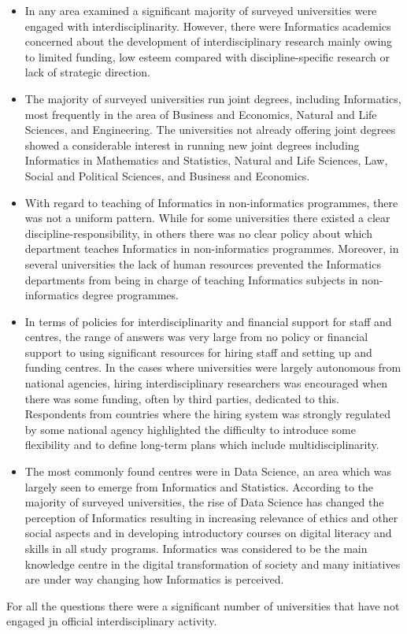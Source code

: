 \begin{itemize}
\item In any area examined a significant majority of surveyed universities were engaged with interdisciplinarity. However, there were Informatics academics concerned about the development of interdisciplinary research mainly owing to limited funding, low esteem compared with discipline-specific research or lack of strategic direction.
\item The majority of surveyed universities run joint degrees, including Informatics, most frequently in the area of Business and Economics, Natural and Life Sciences, and Engineering. The universities not already offering joint degrees showed a considerable interest in running new joint degrees including Informatics in Mathematics and Statistics, Natural and Life Sciences, Law, Social and Political Sciences, and Business and Economics.
\item With regard to teaching of Informatics in non-informatics programmes, there was not a uniform pattern. While for some universities there existed a clear discipline-responsibility, in others there was no clear policy about which department teaches Informatics in non-informatics programmes. Moreover, in several universities the lack of human resources prevented the Informatics departments from being in charge of teaching Informatics subjects in non-informatics degree programmes.
\item In terms of policies for interdisciplinarity and financial support for staff and centres, the range of answers was very large from no policy or financial support to using significant resources for hiring staff and setting up and funding centres. In the cases where universities were largely autonomous from national agencies, hiring interdisciplinary researchers was encouraged when there was some funding, often by third parties, dedicated to this. Respondents from countries where the hiring system was strongly regulated by some national agency highlighted the difficulty to introduce some flexibility and to define long-term plans which include multidisciplinarity.
\item The most commonly found centres were in Data Science, an area which was largely seen to emerge from Informatics and Statistics. According to the majority of surveyed universities, the rise of Data Science has changed the perception of Informatics resulting in increasing relevance of ethics and other social aspects and in developing introductory courses on digital literacy and skills in all study programs. Informatics was considered to be the main knowledge centre in the digital transformation of society and many initiatives are under way changing how Informatics is perceived.
\end{itemize}

For all the questions there were a significant number of universities that have not engaged jn official interdisciplinary activity.


